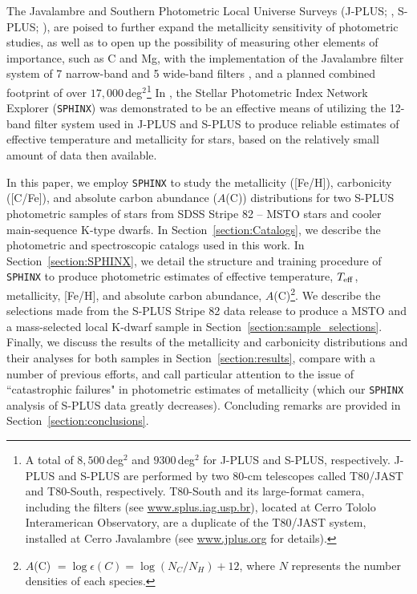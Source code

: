 \documentclass[twocolumn,trackchanges]{aastex63}
\begin{document}
The Javalambre and Southern Photometric Local Universe Surveys (J-PLUS; \citealt{Cenarro:2019}, S-PLUS; \citealt{Mendes:2019}), are poised to further expand the metallicity sensitivity of photometric studies, as well as to open up the possibility of measuring other elements of importance, such as C and Mg, with the implementation of the Javalambre filter system of 7 narrow-band
and 5 wide-band filters \citep{MarinFranch12}, and a planned combined footprint of over $17,000$\,deg$^2$\footnote{A total of $8,500$\,deg$^2$ and $9300$\,deg$^2$ for J-PLUS and S-PLUS, respectively. J-PLUS and S-PLUS are performed by two 80-cm telescopes called T80/JAST and T80-South, respectively. T80-South and its large-format camera, including the filters (see \href{www.splus.iag.usp.br}{www.splus.iag.usp.br}), located at Cerro Tololo Interamerican Observatory, are a duplicate of the T80/JAST system, installed at Cerro Javalambre (see \href{www.jplus.org}{www.jplus.org} for details).} In \citet{Whitten:2019a}, the Stellar Photometric Index Network Explorer (\texttt{SPHINX}) was demonstrated to be an effective means of utilizing the 12-band filter system used in J-PLUS and S-PLUS to produce reliable estimates of effective temperature and metallicity for stars, based on the relatively small amount of data then available. 

In this paper, we employ \texttt{SPHINX} to study the metallicity ([Fe/H]), carbonicity ([C/Fe]), and absolute carbon abundance ($A$(C)) distributions for two S-PLUS photometric samples of stars from SDSS Stripe 82 -- MSTO stars and cooler main-sequence K-type dwarfs. In Section~\ref{section:Catalogs}, we describe the photometric and spectroscopic catalogs used in this work. In Section~\ref{section:SPHINX}, we detail the structure and training procedure of \texttt{SPHINX} to produce photometric estimates of effective temperature, $T_{\rm eff}$, metallicity, [Fe/H], and absolute carbon abundance, $A$(C)\footnote{$A$(C) $= \log{\epsilon (C)} = \log(N_C/N_H) + 12$, where $N$ represents the number densities of each species.}. We describe the selections made from the S-PLUS Stripe 82 data release to produce a MSTO and a mass-selected local K-dwarf sample in Section~\ref{section:sample_selections}. Finally, we discuss the results of the metallicity and carbonicity distributions and their analyses for both samples in Section~\ref{section:results}, compare with a number of previous efforts, and call particular attention to the issue of ``catastrophic failures" in photometric estimates of metallicity (which our \texttt{SPHINX} analysis of S-PLUS data greatly decreases).  Concluding remarks are provided in Section~\ref{section:conclusions}.
\end{document}
